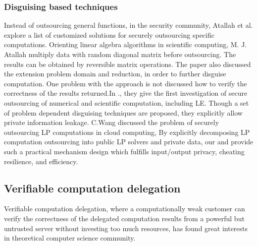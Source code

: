 \documentclass[runningheads,a4paper]{llncs}
\begin{document}
\subsubsection{Disguising based techniques}
Instead of outsourcing general functions, in the security community, Atallah et al. explore a list of customized solutions \cite{t19}\cite{t20}\cite{t21}\cite{t22} for securely outsourcing specific computations. Orienting linear algebra algorithms in scientific computing, M. J. Atallah\cite{t19} multiply data with random diagonal matrix before outsourcing. The results can be obtained by reversible matrix operations. The paper also discussed the extension problem domain and reduction, in order to further disguise computation. One problem with the approach is not discussed how to verify the correctness of the results returned.In \cite{t20}., they give the first investigation of secure outsourcing of numerical and scientific computation, including LE. Though a set of problem dependent disguising techniques are proposed, they explicitly allow private information leakage.
C.Wang\cite{t5} discussed the problem of securely outsourcing LP computations in cloud computing, By explicitly decomposing LP computation outsourcing into public LP solvers and private data, our 
and provide such a practical mechanism design which fulfills input/output privacy, cheating resilience, and efficiency.
% 
\subsection{Verifiable computation delegation}

Verifiable computation delegation, where a computationally weak customer can verify the correctness of the delegated computation results from a powerful but untrusted server without investing too much resources, has found great interests in theoretical computer science community.
\end{document}
